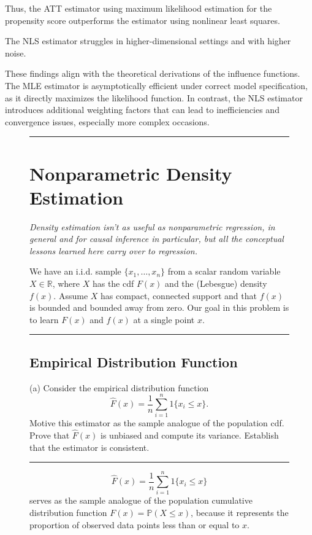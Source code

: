 \documentclass{article}
\newenvironment{colorparagraph}[1]{\par\color{#1}}{\par}
\begin{document}
Thus, the ATT estimator using maximum likelihood estimation for the propensity score outperforms the estimator using nonlinear least squares.

The NLS estimator struggles in higher-dimensional settings and with higher noise.

These findings align with the theoretical derivations of the influence functions. The MLE estimator is asymptotically efficient under correct model specification, as it directly maximizes the likelihood function. In contrast, the NLS estimator introduces additional weighting factors that can lead to inefficiencies and convergence issues, especially more complex occasions.

\begin{figure}[H]
\begin{colorparagraph}{questioncolor}

\rule{\textwidth}{0.5pt}
\label{q2}
\section{Nonparametric Density Estimation}

\textit{Density estimation isn't as useful as nonparametric regression, in general and for causal inference in particular, but all the conceptual lessons learned here carry over to regression.}

We have an i.i.d. sample \(\{x_1, \dots, x_n\}\) from a scalar random variable \( X \in \mathbb{R} \), where \( X \) has the cdf \( F(x) \) and the (Lebesgue) density \( f(x) \). Assume \( X \) has compact, connected support and that \( f(x) \) is bounded and bounded away from zero. Our goal in this problem is to learn \( F(x) \) and \( f(x) \) at a single point \( x \).

\rule{\textwidth}{0.5pt}
\end{colorparagraph}

\begin{colorparagraph}{questioncolor}
\label{q2a}
\subsection{Empirical Distribution Function}
(a) Consider the empirical distribution function
\[
\hat{F}(x) = \frac{1}{n} \sum_{i=1}^n 1\{x_i \leq x\}.
\]
Motive this estimator as the sample analogue of the population cdf. Prove that \( \hat{F}(x) \) is unbiased and compute its variance. Establish that the estimator is consistent.

\rule{\textwidth}{0.5pt}
\end{colorparagraph}

\[
\hat{F}(x) = \frac{1}{n} \sum_{i=1}^n 1\{ x_i \leq x \}
\]
serves as the sample analogue of the population cumulative distribution function \( F(x) = \mathbb{P}(X \leq x) \), because it represents the proportion of observed data points less than or equal to \( x \).
\end{figure}
\end{document}
